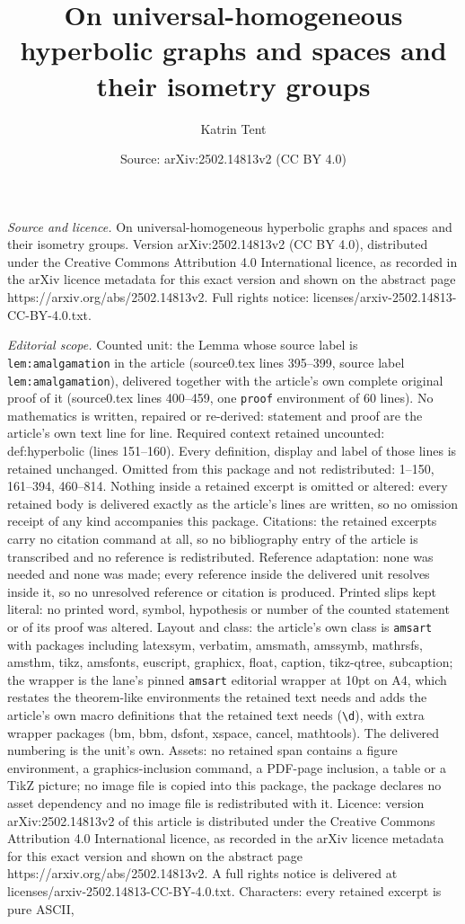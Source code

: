 \documentclass[10pt,a4paper]{amsart}
\title[On universal-homogeneous hyperbolic graphs and spaces and th]{On universal-homogeneous hyperbolic graphs and spaces and their isometry groups}
\author{Katrin Tent}
\date{Source: arXiv:2502.14813v2 (CC BY 4.0)}
\begin{document}
\maketitle

\noindent\emph{Source and licence.} On universal-homogeneous hyperbolic graphs and spaces and their isometry groups. Version arXiv:2502.14813v2 (CC BY 4.0), distributed under the Creative Commons Attribution 4.0 International licence, as recorded in the arXiv licence metadata for this exact version and shown on the abstract page https://arxiv.org/abs/2502.14813v2. Full rights notice: licenses/arxiv-2502.14813-CC-BY-4.0.txt.\par\smallskip

\noindent\textit{Editorial scope.} Counted unit: the Lemma whose source label is \texttt{lem:amalgamation} in the article (source0.tex lines 395--399, source label \texttt{lem:amalgamation}), delivered together with the article's own complete original proof of it (source0.tex lines 400--459, one \texttt{proof} environment of 60 lines). No mathematics is written, repaired or re-derived: statement and proof are the article's own text line for line. Required context retained uncounted: def:hyperbolic (lines 151--160). Every definition, display and label of those lines is retained unchanged. Omitted from this package and not redistributed: 1--150, 161--394, 460--814. Nothing inside a retained excerpt is omitted or altered: every retained body is delivered exactly as the article's lines are written, so no omission receipt of any kind accompanies this package. Citations: the retained excerpts carry no citation command at all, so no bibliography entry of the article is transcribed and no reference is redistributed. Reference adaptation: none was needed and none was made; every reference inside the delivered unit resolves inside it, so no unresolved reference or citation is produced. Printed slips kept literal: no printed word, symbol, hypothesis or number of the counted statement or of its proof was altered. Layout and class: the article's own class is \texttt{amsart} with packages including latexsym, verbatim, amsmath, amssymb, mathrsfs, amsthm, tikz, amsfonts, euscript, graphicx, float, caption, tikz-qtree, subcaption; the wrapper is the lane's pinned \texttt{amsart} editorial wrapper at 10pt on A4, which restates the theorem-like environments the retained text needs and adds the article's own macro definitions that the retained text needs (\texttt{\textbackslash d}), with extra wrapper packages (bm, bbm, dsfont, xspace, cancel, mathtools). The delivered numbering is the unit's own. Assets: no retained span contains a figure environment, a graphics-inclusion command, a PDF-page inclusion, a table or a TikZ picture; no image file is copied into this package, the package declares no asset dependency and no image file is redistributed with it. Licence: version arXiv:2502.14813v2 of this article is distributed under the Creative Commons Attribution 4.0 International licence, as recorded in the arXiv licence metadata for this exact version and shown on the abstract page https://arxiv.org/abs/2502.14813v2. A full rights notice is delivered at licenses/arxiv-2502.14813-CC-BY-4.0.txt. Characters: every retained excerpt is pure ASCII, 
\end{document}
